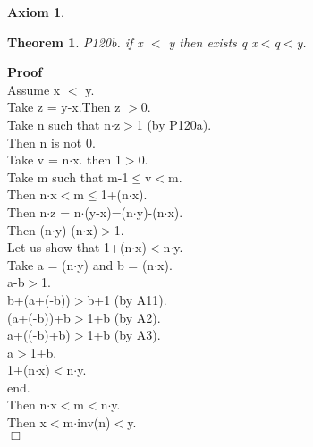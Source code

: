 \documentclass{article}
\newenvironment{forthel}{\begin{leftbar}}{\end{leftbar}}
\newenvironment{proof}{\noindent\textbf{Proof\ }}{\hspace*{\fill}$\Box$\medskip}
\newtheorem{axiom}{Axiom}
\newtheorem{theorem}{Theorem}
\begin{document}
\begin{forthel}
\begin{axiom}
\end{axiom}



\begin{theorem}
 P120b. if x $<$ y then exists q   x$<$q$<$y.
\end{theorem}\begin{proof}\\
Assume x $<$ y.\\
Take z = y-x.Then z $>$0.\\
Take n  such that n$\cdot$z$>$1 (by P120a).\\
Then n is not 0.\\
Take v = n$\cdot$x. then 1$>$0.\\
Take m such that m-1$\leq$v$<$m.\\
Then n$\cdot$x$<$m$\leq$1+(n$\cdot$x).\\
Then n$\cdot$z = n$\cdot$(y-x)=(n$\cdot$y)-(n$\cdot$x).\\
Then (n$\cdot$y)-(n$\cdot$x)$>$1.\\

Let us show that 1+(n$\cdot$x)$<$n$\cdot$y.\\
Take a = (n$\cdot$y) and b = (n$\cdot$x).\\
a-b$>$1.\\
b+(a+(-b))$>$b+1 (by A11).\\
(a+(-b))+b$>$1+b (by A2).\\
a+((-b)+b)$>$1+b (by A3).\\
a$>$1+b.\\
1+(n$\cdot$x)$<$n$\cdot$y.\\
end.\\

Then n$\cdot$x$<$m$<$n$\cdot$y.\\
Then x$<$m$\cdot$inv(n)$<$y.\\

\end{proof}












\end{forthel}
\end{document}
